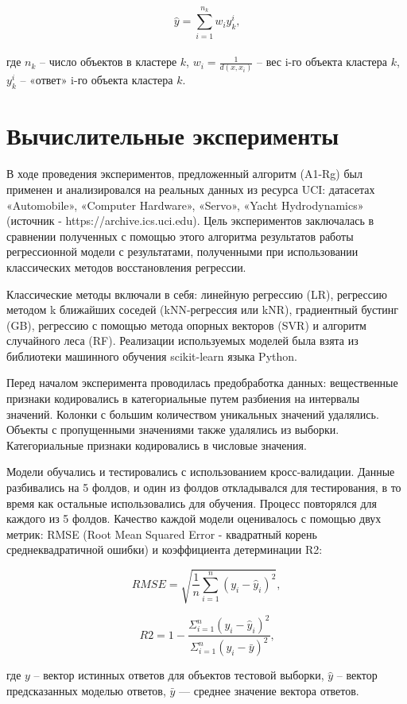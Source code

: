 \documentclass{article}
\begin{document}
    $$\hat{y} = \sum_{i=1}^{n_k} w_iy_k^i\text{,}$$\\
    
    где $n_k$ -- число объектов в кластере $k$, $w_i = \frac{1}{d(x, x_i)}$ -- вес i-го объекта кластера $k$, $y_k^i$ -- «ответ»  i-го объекта кластера $k$.

\section{Вычислительные эксперименты}
В ходе проведения экспериментов, предложенный алгоритм (A1-Rg) был применен и анализировался на реальных данных из ресурса UCI: датасетах «Automobile», «Computer Hardware», «Servo», «Yacht Hydrodynamics» (источник - https://archive.ics.uci.edu). Цель экспериментов заключалась в сравнении полученных с помощью этого алгоритма результатов работы регрессионной модели с результатами, полученными при использовании классических методов восстановления регрессии.

Классические методы включали в себя: линейную регрессию (LR), регрессию методом k ближайших соседей (kNN-регрессия или kNR), градиентный бустинг (GB), регрессию с помощью метода опорных векторов (SVR) и алгоритм случайного леса (RF). Реализации используемых моделей была взята из библиотеки машинного обучения scikit-learn языка Python.

Перед началом эксперимента проводилась предобработка данных: вещественные признаки кодировались в категориальные путем разбиения на интервалы значений. Колонки с большим количеством уникальных значений удалялись. Объекты с пропущенными значениями также удалялись из выборки. Категориальные признаки кодировались в числовые значения.

Модели обучались и тестировались с использованием кросс-валидации. Данные разбивались на 5 фолдов, и один из фолдов откладывался для тестирования, в то время как остальные использовались для обучения. Процесс повторялся для каждого из 5 фолдов. Качество каждой модели оценивалось с помощью двух метрик: RMSE (Root Mean Squared Error - квадратный корень среднеквадратичной ошибки) и коэффициента детерминации R2: 

$$
RMSE = \sqrt{\frac{1}{n} \sum_{i=1}^{n}\left(y_{i}-\hat{y}_{i}\right)^{2}},
$$

\[R2 = 1 - \frac{\Sigma_{i=1}^{n}(y_i -\hat{y}_i)^{2}}{\Sigma_{i=1}^{n}(y_i - \bar{y})^{2}} \text{,} \]

где $y$ -- вектор истинных ответов для объектов тестовой выборки, $\hat{y}$ -- вектор предсказанных моделью ответов, \(\bar{y}\) — среднее значение вектора ответов.
\end{document}
